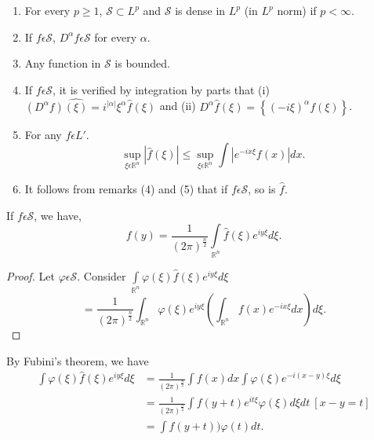  \begin{remarks*}%
   \begin{enumerate}[(1)]
   \item For every $p \ge 1$, $\mathscr{S} \subset L^p$ and
     $\mathscr{S}$ is dense in $L^p $ (in $L^p$ norm) if $p <
     \infty$. 
   \item If $f \epsilon \mathscr{S}$, $D^\alpha f \epsilon
     \mathscr{S}$ for every $\alpha$. 
   \item Any function in $\mathscr{S}$ is bounded. 
   \item If $f \epsilon \mathscr{S}$, it is verified by integration
     by parts that (i) $(D^\alpha f)\hat{(\xi)} = i^{|\alpha|}
     \xi^\alpha \hat{f} (\xi)$ and (ii) $D^\alpha \hat{f} (\xi) =
     \left\{ (-i \xi)^\alpha f (\xi) \right\}$. 
   \item For any $f \epsilon L'$. 
     $$
     \sup\limits_{ \xi  \epsilon \mathbb{R}^n} \left| \hat{f}
     (\xi)\right| \le \sup\limits_{\xi \epsilon \mathbb{R}^n} \int
     \left| e^{-ix \xi} f(x)\right| dx. 
     $$
   \item It follows from remarks (4) and (5) that if $f
     \epsilon \mathscr{S}$, so is $\hat{f}$.   
   \end{enumerate}
 \end{remarks*} 

\setcounter{proposition}{0}
\begin{proposition}\label{chap3:sec4:prop1}%
   If $f \epsilon \mathscr{S}$, we have, 
   $$
   f (y)  = \frac{1}{(2 \pi)^{\frac{n}{2}}} \int\limits_{\mathbb{R}^n}
   \hat{f} (\xi) e^{iy \xi} d \xi. 
   $$
\end{proposition} 

\begin{proof}
  Let $\varphi \epsilon \mathscr{S}$. Consider
  $\int\limits_{\mathbb{R}^n} \varphi (\xi) \hat{f} (\xi) e^{iy \xi} d
  \xi$ 
  $$
  = \frac{1}{(2 \pi) ^{\frac{n}{2}}} \int_{\mathbb{R}^n} \varphi (\xi)
  e^{iy \xi} (\int_{\mathbb{R}^n} f (x) e^{-ix \xi} dx) d \xi. 
  $$
 \end{proof}

By Fubini's theorem, we have
\begin{align*}
  \int \varphi (\xi) \hat{f} (\xi) e^{iy \xi} d \xi & = \frac{1}{(2
    \pi)^{\frac{n}{2}}} \int f (x) dx \int \varphi (\xi) e^{-i (x-y)
    \xi} d \xi\\ 
  & = \frac{1}{(2 \pi)^{\frac{n}{2}}} \int f (y +t) e^{it \xi} \varphi
  (\xi) d \xi dt ~[x-y =t] \\ 
  & = \int f (y +t)) \hat{\varphi} (t) dt. \tag{4.1}\label{chap3:sec4:eq4.1}
\end{align*} 
 
